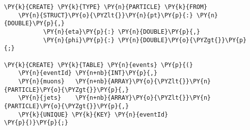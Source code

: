 \begin{Verbatim}[commandchars=\\\{\}]
\PY{k}{CREATE} \PY{k}{TYPE} \PY{n}{PARTICLE} \PY{k}{FROM}
    \PY{n}{STRUCT}\PY{o}{\PYZlt{}}\PY{n}{pt}\PY{p}{:} \PY{n}{DOUBLE}\PY{p}{,}
           \PY{n}{eta}\PY{p}{:} \PY{n}{DOUBLE}\PY{p}{,}
           \PY{n}{phi}\PY{p}{:} \PY{n}{DOUBLE}\PY{o}{\PYZgt{}}\PY{p}{;}

\PY{k}{CREATE} \PY{k}{TABLE} \PY{n}{events} \PY{p}{(}
    \PY{n}{eventId} \PY{n+nb}{INT}\PY{p}{,}
    \PY{n}{muons}   \PY{n+nb}{ARRAY}\PY{o}{\PYZlt{}}\PY{n}{PARTICLE}\PY{o}{\PYZgt{}}\PY{p}{,}
    \PY{n}{jets}    \PY{n+nb}{ARRAY}\PY{o}{\PYZlt{}}\PY{n}{PARTICLE}\PY{o}{\PYZgt{}}\PY{p}{,}
    \PY{k}{UNIQUE} \PY{k}{KEY} \PY{n}{eventId}
\PY{p}{)}\PY{p}{;}
\end{Verbatim}

